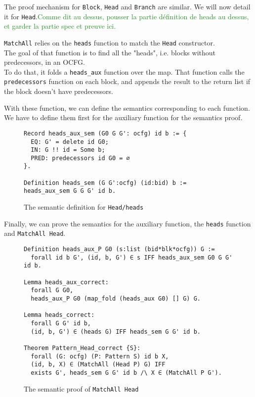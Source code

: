 \documentclass[11pt]{article}
\newcommand{\inlinecoq}[1]{\mbox{\lstinline[style=customcoq,columns=fixed,basewidth=.48em]{#1}}}
\newcommand{\ilc}[1]{\inlinecoq{#1}}
\newcommand{\yz}[1]{\textcolor{ForestGreen}{#1}}
\begin{document}
The proof mechanism for \ilc{Block}, \ilc{Head} and \ilc{Branch} are similar. We will now detail it for \ilc{Head}.\yz{Comme dit au dessus, pousser la partie définition de heads au dessus, et garder la partie spec et preuve ici.}

\ilc{MatchAll} relies on the \ilc{heads} function to match the \ilc{Head} constructor.\\
The goal of that function is to find all the "heads", i.e. blocks without predecessors, in an OCFG.\\
To do that, it folds a \ilc{heads_aux} function over the map. That function calls the \ilc{predecessors} function on each block, and appends the result to the return list if the block doesn't have predecessors.

With these function, we can define the semantics corresponding to each function. We have to define them first for the auxiliary function for the semantics proof.

\begin{figure}
  \begin{lstlisting}[style=customcoq,basicstyle=\small\ttfamily]
Record heads_aux_sem (G0 G G': ocfg) id b := {
  EQ: G' = delete id G0;
  IN: G !! id = Some b;
  PRED: predecessors id G0 = ∅
}.

Definition heads_sem (G G':ocfg) (id:bid) b := heads_aux_sem G G G' id b.
  \end{lstlisting}
  \caption{The semantic definition for \ilc{Head/heads}}
  \label{fig:sem_head_def}
\end{figure}

Finally, we can prove the semantics for the auxiliary function, the \ilc{heads} function and \ilc{MatchAll Head}.

\begin{figure}
  \begin{lstlisting}[style=customcoq,basicstyle=\small\ttfamily]
Definition heads_aux_P G0 (s:list (bid*blk*ocfg)) G :=
  forall id b G', (id, b, G') ∈ s IFF heads_aux_sem G0 G G' id b.

Lemma heads_aux_correct:
  forall G G0,
  heads_aux_P G0 (map_fold (heads_aux G0) [] G) G.

Lemma heads_correct:
  forall G G' id b,
  (id, b, G') ∈ (heads G) IFF heads_sem G G' id b.

Theorem Pattern_Head_correct {S}:
  forall (G: ocfg) (P: Pattern S) id b X,
  (id, b, X) ∈ (MatchAll (Head P) G) IFF
  exists G', heads_sem G G' id b /\ X ∈ (MatchAll P G').
  \end{lstlisting}
  \caption{The semantic proof of \ilc{MatchAll Head}}
  \label{fig:head_cor}
\end{figure}
\end{document}

